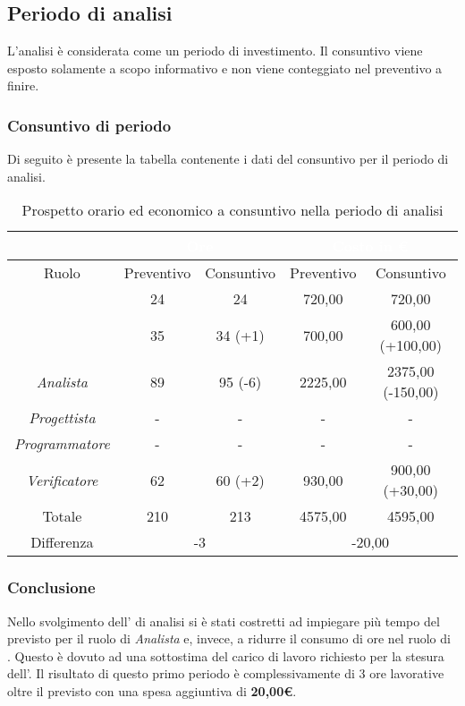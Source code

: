 \subsection{Periodo di analisi}
L'analisi è considerata come un periodo di investimento. Il consuntivo viene esposto solamente a scopo informativo e non viene conteggiato nel preventivo a finire.
\subsubsection{Consuntivo di periodo}
Di seguito è presente la tabella contenente i dati del consuntivo per il periodo di analisi.
\begin{table}[H]
	\centering
	\begin{tabular}{|c|c|c|c|c|}
		\rowcolor{darkblue} 
		&\multicolumn{2}{c|}{\textcolor{white}{Ore}}&\multicolumn{2}{c|}{\textcolor{white}{Costo in €}}\\ \hline
		Ruolo				&	Preventivo			&	Consuntivo		&	Preventivo	&	Consuntivo\\ \hline
		{\Responsabile}		&	24					&	24				&	720,00		&	720,00 \\ \hline
		{\Amministratore}	&	35					&	34 (+1)			&	700,00		&	600,00 (+100,00) \\ \hline
		\textit{Analista}	&	89					&	95 (-6)			&	2225,00		&	2375,00 (-150,00) \\ \hline
		\textit{Progettista}& 	-					&	- 				& 	-			&  	- \\ \hline
		\textit{Programmatore}& -					& 	-				& 	-			&  	- \\ \hline
		\textit{Verificatore}&	62					&	60 (+2)			&	930,00		&	900,00 (+30,00) \\ \hline
		Totale				&	210					&	213				&	4575,00		&	4595,00 \\ \hline
		Differenza			& 	\multicolumn{2}{c|}{-3} 				& \multicolumn{2}{c|}{-20,00}\\ \hline
	\end{tabular}
	\caption{Prospetto orario ed economico a consuntivo nella periodo di analisi}
\end{table}
\subsubsection{Conclusione}
Nello svolgimento dell' di analisi si è stati costretti ad impiegare più tempo del previsto per il ruolo di \textit{Analista} e, invece, a ridurre il consumo di ore nel ruolo di {\Amministratore}. Questo è dovuto ad una sottostima del carico di lavoro richiesto per la stesura dell'. Il risultato di questo primo periodo è complessivamente di 3 ore lavorative oltre il previsto con una spesa aggiuntiva di \textbf{20,00€}.
